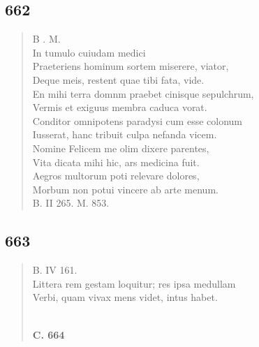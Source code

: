\documentclass[11pt, a4paper]{report}
\begin{document}
            \subsection*{662}
      \begin{verse}
      B . M. \\ In tumulo cuiudam medici \\ Praeteriens hominum sortem miserere, viator, \\ Deque meis, restent quae tibi fata, vide. \\ En mihi terra domnm praebet cinisque sepulchrum, \\ Vermis et exiguus membra caduca vorat. \\ Conditor omnipotens paradysi cum esse colonum \\ Iusserat, hanc tribuit culpa nefanda vicem. \\ Nomine Felicem me olim dixere parentes, \\ Vita dicata mihi hic, ars medicina fuit. \\ Aegros multorum poti relevare dolores, \\ Morbum non potui vincere ab arte menum. \\ B. II 265. M. 853. \\ 
      \end{verse}
  
            \subsection*{663}
      \begin{verse}
      B. IV 161. \\ Littera rem gestam loquitur; res ipsa medullam \\ Verbi, quam vivax mens videt, intus habet. \\ 
        ﻿\pagebreak 
    \begin{center} \textbf{C. 664} \end{center} \marginpar{[134]} 
      \end{verse}
  
\end{document}
